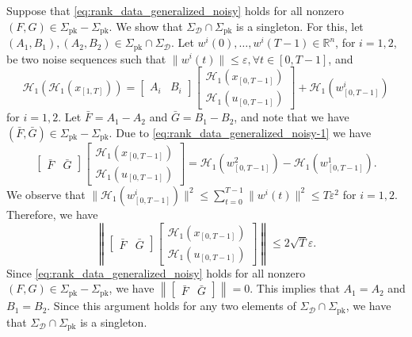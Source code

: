 \documentclass[journal,twoside,web]{ieeecolor}
\newcommand{\norm}[1]{\left\|#1\right\|}
\begin{document}
Suppose that \eqref{eq:rank_data_generalized_noisy} holds for all nonzero \mbox{$(F,G)\in\Sigma_\text{pk}-\Sigma_\text{pk}$}. We show that $\Sigma_\mathcal{D}\cap\Sigma_\text{pk}$ is a singleton. For this, let $(A_1,B_1),(A_2,B_2)\in\Sigma_\text{pk}\cap\Sigma_\mathcal{D}$. Let \mbox{$w^i(0),\ldots,w^i(T-1)\in\mathbb{R}^{n}$}, for $i=1,2$, be two noise sequences such that $\|w^i(t)\|\leq\varepsilon, \forall t\in[0,T-1]$, and
\begin{equation}
\label{eq:rank_data_generalized_noisy-1}
\mathcal{H}_1(\mathcal{H}_1(x_{[1,T]}))=\begin{bmatrix}
A_i & B_i
\end{bmatrix}\begin{bmatrix}
\mathcal{H}_1(x_{[0,T-1]}) \\
\mathcal{H}_1(u_{[0,T-1]})
\end{bmatrix}+\mathcal{H}_1(w^i_{[0,T-1]}) 
\end{equation}
for $i=1,2$. Let $\bar{F}=A_1-A_2$ and $\bar{G}=B_1-B_2$, and note that we have $(\bar{F},\bar{G})\in\Sigma_\text{pk}-\Sigma_\text{pk}$. Due to \eqref{eq:rank_data_generalized_noisy-1} we have
\begin{equation}
\begin{bmatrix}
\bar{F} & \bar{G}
\end{bmatrix}\begin{bmatrix}
\mathcal{H}_1(x_{[0,T-1]}) \\
\mathcal{H}_1(u_{[0,T-1]})
\end{bmatrix}=\mathcal{H}_1(w^2_{[0,T-1]})-\mathcal{H}_1(w^1_{[0,T-1]}).
\end{equation}
We observe that $\|\mathcal{H}_1(w^i_{[0,T-1]})\|^2\leq\sum_{t=0}^{T-1} \|w^i(t)\|^2\leq T\varepsilon^2$
for $i=1,2$. Therefore, we have
\begin{equation}
\norm{\begin{bmatrix}
\bar{F} & \bar{G}
\end{bmatrix}\begin{bmatrix}
\mathcal{H}_1(x_{[0,T-1]}) \\
\mathcal{H}_1(u_{[0,T-1]})
\end{bmatrix}}\leq 2\sqrt{T}\varepsilon.
\end{equation}
Since \eqref{eq:rank_data_generalized_noisy} holds for all nonzero $(F,G)\in\Sigma_\text{pk}-\Sigma_\text{pk}$, we have
 $\norm{\begin{bmatrix}
\bar{F} & \bar{G}
\end{bmatrix}}=0$. This implies that $A_1=A_2$ and $B_1=B_2$. Since this argument holds for any two elements of $\Sigma_\mathcal{D}\cap\Sigma_\text{pk}$, we have that $\Sigma_\mathcal{D}\cap\Sigma_\text{pk}$ is a singleton. \hfill \QED
\end{document}
